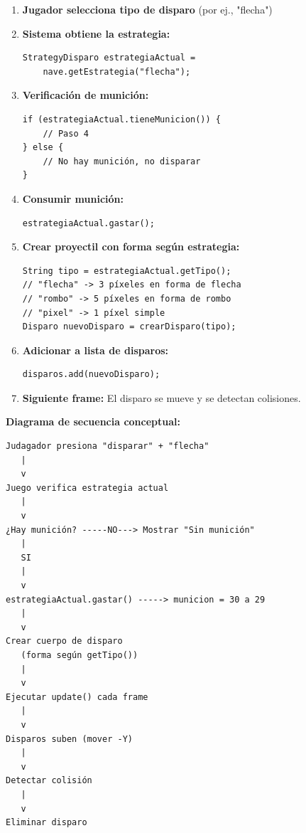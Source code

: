 \documentclass[12pt]{article}
\begin{document}
\begin{enumerate}
    \item \textbf{Jugador selecciona tipo de disparo} (por ej., "flecha")
    
    \item \textbf{Sistema obtiene la estrategia:}
    \begin{lstlisting}
StrategyDisparo estrategiaActual = 
    nave.getEstrategia("flecha");
    \end{lstlisting}
    
    \item \textbf{Verificación de munición:}
    \begin{lstlisting}
if (estrategiaActual.tieneMunicion()) {
    // Paso 4
} else {
    // No hay munición, no disparar
}
    \end{lstlisting}
    
    \item \textbf{Consumir munición:}
    \begin{lstlisting}
estrategiaActual.gastar();
    \end{lstlisting}
    
    \item \textbf{Crear proyectil con forma según estrategia:}
    \begin{lstlisting}
String tipo = estrategiaActual.getTipo();
// "flecha" -> 3 píxeles en forma de flecha
// "rombo" -> 5 píxeles en forma de rombo
// "pixel" -> 1 píxel simple
Disparo nuevoDisparo = crearDisparo(tipo);
    \end{lstlisting}
    
    \item \textbf{Adicionar a lista de disparos:}
    \begin{lstlisting}
disparos.add(nuevoDisparo);
    \end{lstlisting}
    
    \item \textbf{Siguiente frame:} El disparo se mueve y se detectan colisiones.
\end{enumerate}

\textbf{Diagrama de secuencia conceptual:}

\begin{verbatim}
Judagador presiona "disparar" + "flecha"
   |
   v
Juego verifica estrategia actual
   |
   v
¿Hay munición? -----NO---> Mostrar "Sin munición"
   |
   SI
   |
   v
estrategiaActual.gastar() -----> municion = 30 a 29
   |
   v
Crear cuerpo de disparo
   (forma según getTipo())
   |
   v
Ejecutar update() cada frame
   |
   v
Disparos suben (mover -Y)
   |
   v
Detectar colisión
   |
   v
Eliminar disparo
\end{verbatim}
\end{document}
